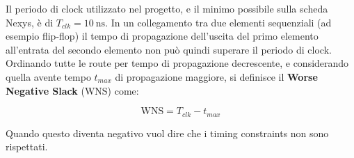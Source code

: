 Il periodo di clock utilizzato nel progetto, e il minimo possibile sulla
scheda Nexys, è di $T_{clk} = \SI{10}{\nano\second}$.
In un collegamento tra due elementi sequenziali (ad esempio flip-flop)
il tempo di propagazione dell'uscita del primo elemento all'entrata del
secondo elemento non può quindi superare il periodo di clock.
Ordinando tutte le route per tempo di propagazione decrescente, e
considerando quella avente tempo $t_{max}$ di propagazione maggiore, si definisce
il \textbf{Worse Negative Slack} (WNS) come:

\[
\textrm{WNS} = T_{clk} - t_{max}
\] 

Quando questo diventa negativo vuol dire che i timing constraints non
sono rispettati. 
